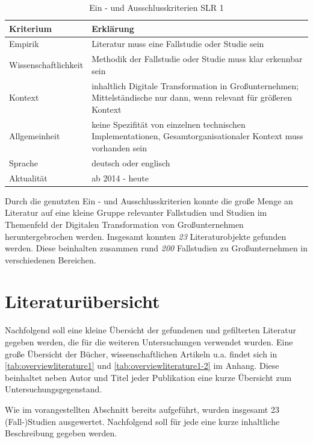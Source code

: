 \begin{table}[ht]
	\centering
	\caption{Ein - und Ausschlusskriterien SLR 1}
	\begin{tabular}{|p{4cm}|p{8cm}|}
		\hline
		\textbf{Kriterium}& \textbf{Erklärung}  \\
		\hline
		Empirik & Literatur muss eine Fallstudie oder Studie sein \\
		Wissenschaftlichkeit & Methodik der  Fallstudie oder Studie muss klar erkennbar sein \\
		Kontext & inhaltlich Digitale Transformation in Großunternehmen; Mittelständische nur dann, wenn relevant für größeren Kontext \\
		Allgemeinheit & keine Spezifität von einzelnen technischen Implementationen, Gesamtorganisationaler Kontext muss vorhanden sein \\
		Sprache & deutsch oder englisch \\
		Aktualität & ab 2014 - heute  \\
		\hline
	\end{tabular}
	\label{tab:criteriaslr1}
\end{table}

Durch die genutzten Ein - und Ausschlusskriterien konnte die große Menge an Literatur auf eine kleine Gruppe relevanter Fallstudien und Studien im Themenfeld der Digitalen Transformation von Großunternehmen heruntergebrochen werden. Insgesamt konnten \textit{23} Literaturobjekte gefunden werden. Diese beinhalten zusammen rund \textit{200} Fallstudien zu Großunternehmen in verschiedenen Bereichen.

\section{Literaturübersicht}


Nachfolgend soll eine kleine Übersicht der gefundenen und gefilterten Literatur gegeben werden, die für die weiteren Untersuchungen verwendet wurden. Eine große Übersicht der  Bücher, wissenschaftlichen Artikeln u.a. findet sich in \ref{tab:overviewliterature1} und \ref{tab:overviewliterature1-2} im Anhang. Diese beinhaltet neben Autor und Titel jeder Publikation eine kurze Übersicht zum Untersuchungsgegenstand.

Wie im vorangestellten Abschnitt bereits aufgeführt, wurden insgesamt 23 (Fall-)Studien ausgewertet. Nachfolgend soll für jede eine kurze inhaltliche Beschreibung gegeben werden.

